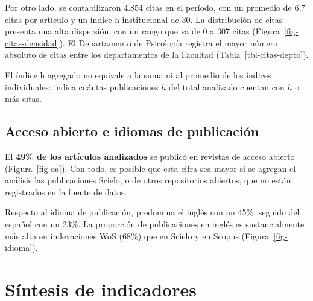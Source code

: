\documentclass[
  spanish,
  a4paper,
  oneside]{scrbook}
\begin{document}
Por otro lado, se contabilizaron 4.854 citas en el período, con un
promedio de 6,7 citas por artículo y un índice h institucional de 30. La
distribución de citas presenta una alta dispersión, con un rango que va
de 0 a 307 citas (Figura~\ref{fig-citas-densidad}). El Departamento de
Psicología registra el mayor número absoluto de citas entre los
departamentos de la Facultad (Tabla~\ref{tbl-citas-depto}).

\begin{tcolorbox}[enhanced jigsaw, rightrule=.15mm, toprule=.15mm, colframe=quarto-callout-note-color-frame, colback=white, arc=.35mm, leftrule=.75mm, opacityback=0, breakable, bottomrule=.15mm, left=2mm]
\begin{minipage}[t]{5.5mm}
\textcolor{quarto-callout-note-color}{\faInfo}
\end{minipage}%
\begin{minipage}[t]{\textwidth - 5.5mm}

El índice h agregado no equivale a la suma ni al promedio de los índices
individuales: indica cuántas publicaciones \(h\) del total analizado
cuentan con \(h\) o más citas.

\end{minipage}%
\end{tcolorbox}

\subsection*{Acceso abierto e idiomas de
publicación}\label{acceso-abierto-e-idiomas-de-publicaciuxf3n}

El \textbf{49\% de los artículos analizados} se publicó en revistas de
acceso abierto (Figura~\ref{fig-oa}). Con todo, es posible que esta
cifra sea mayor si se agregan el análisis las publicaciones Scielo, o de
otros repositorios abiertos, que no están registrados en la fuente de
datos.

Respecto al idioma de publicación, predomina el inglés con un 45\%,
seguido del español con un 23\%. La proporción de publicaciones en
inglés es sustancialmente más alta en indexaciones WoS (68\%) que en
Scielo y en Scopus (Figura~\ref{fig-idioma}).

\section*{Síntesis de indicadores}\label{suxedntesis-de-indicadores}
\end{document}
